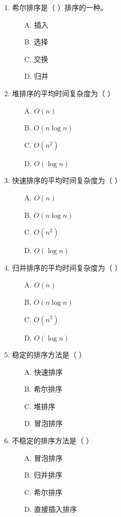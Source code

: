 \documentclass[12pt, a4paper]{article}
\begin{document}
\begin{enumerate}[label=\arabic*.]
	\item 希尔排序是（ ）排序的一种。
	      \begin{enumerate}
		      \item[A.] 插入
		      \item[B.] 选择
		      \item[C.] 交换
		      \item[D.] 归并
	      \end{enumerate}

	\item 堆排序的平均时间复杂度为（ ）
	      \begin{enumerate}
		      \item[A.] $O(n)$
		      \item[B.] $O(n \log n)$
		      \item[C.] $O(n^2)$
		      \item[D.] $O(\log n)$
	      \end{enumerate}

	\item 快速排序的平均时间复杂度为（ ）
	      \begin{enumerate}
		      \item[A.] $O(n)$
		      \item[B.] $O(n \log n)$
		      \item[C.] $O(n^2)$
		      \item[D.] $O(\log n)$
	      \end{enumerate}

	\item 归并排序的平均时间复杂度为（ ）
	      \begin{enumerate}
		      \item[A.] $O(n)$
		      \item[B.] $O(n \log n)$
		      \item[C.] $O(n^2)$
		      \item[D.] $O(\log n)$
	      \end{enumerate}

	\item 稳定的排序方法是（ ）
	      \begin{enumerate}
		      \item[A.] 快速排序
		      \item[B.] 希尔排序
		      \item[C.] 堆排序
		      \item[D.] 冒泡排序
	      \end{enumerate}

	\item 不稳定的排序方法是（ ）
	      \begin{enumerate}
		      \item[A.] 冒泡排序
		      \item[B.] 归并排序
		      \item[C.] 希尔排序
		      \item[D.] 直接插入排序
	      \end{enumerate}


\end{enumerate}
\end{document}
